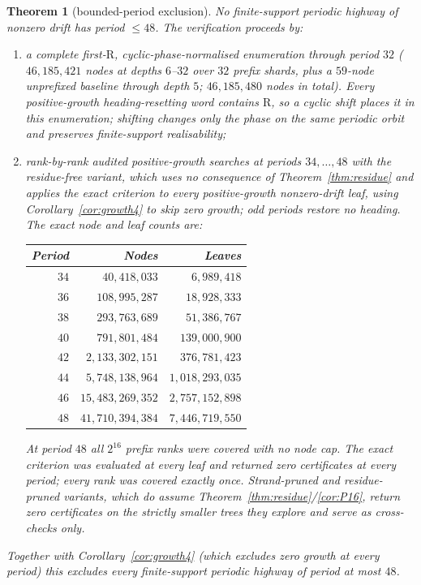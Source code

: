 \documentclass[11pt,reqno]{amsart}
\theoremstyle{plain}
\newtheorem{theorem}{Theorem}[section]
\theoremstyle{definition}
\newcommand{\turnR}{\mathrm{R}}
\begin{document}
\begin{theorem}[bounded-period exclusion]\label{thm:periodexcl}
No finite-support periodic highway of nonzero drift has period $\le 48$. The
verification proceeds by:
\begin{enumerate}[label=\textup{(\alph*)}]
\item a complete first-$\turnR$, cyclic-phase-normalised enumeration through
period $32$ ($46{,}185{,}421$ nodes at depths $6$--$32$ over $32$ prefix shards,
plus a $59$-node unprefixed baseline through depth $5$; $46{,}185{,}480$ nodes in
total). Every positive-growth heading-resetting word contains $\turnR$, so a cyclic
shift places it in this enumeration; shifting changes only the phase on the same
periodic orbit and preserves finite-support realisability;
\item rank-by-rank audited positive-growth searches at periods $34,\dots,48$ with the
\emph{residue-free variant}, which uses no consequence of Theorem~\ref{thm:residue} and
applies the exact criterion to \emph{every} positive-growth nonzero-drift leaf, using
Corollary~\ref{cor:growth4} to skip zero growth; odd periods restore no heading.
The exact node and leaf counts are:
\begin{center}
\small
\begin{tabular}{@{}rrr@{}}
\toprule
Period & Nodes & Leaves\\
\midrule
$34$ & $40{,}418{,}033$      & $6{,}989{,}418$\\
$36$ & $108{,}995{,}287$     & $18{,}928{,}333$\\
$38$ & $293{,}763{,}689$     & $51{,}386{,}767$\\
$40$ & $791{,}801{,}484$     & $139{,}000{,}900$\\
$42$ & $2{,}133{,}302{,}151$ & $376{,}781{,}423$\\
$44$ & $5{,}748{,}138{,}964$ & $1{,}018{,}293{,}035$\\
$46$ & $15{,}483{,}269{,}352$& $2{,}757{,}152{,}898$\\
$48$ & $41{,}710{,}394{,}384$& $7{,}446{,}719{,}550$\\
\bottomrule
\end{tabular}
\end{center}
At period $48$ all $2^{16}$ prefix ranks were covered with no node cap. The
exact criterion was evaluated at every leaf and returned zero certificates at
every period; every rank was covered exactly once.
Strand-pruned and residue-pruned variants, which do assume
Theorem~\ref{thm:residue}/\ref{cor:P16}, return zero certificates on the strictly
smaller trees they explore and serve as cross-checks only.
\end{enumerate}
Together with Corollary~\ref{cor:growth4} (which excludes zero growth at every
period) this excludes every finite-support periodic highway of period at most
$48$.
\end{theorem}
\end{document}
